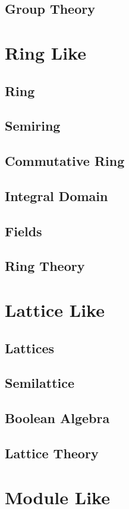 \documentclass[a4paper, 12pt]{article}
\numberwithin{equation}{section}
\begin{document}
\subsection{Group Theory}

\newpage
\section{Ring Like}
\subsection{Ring}
\subsection{Semiring}
\subsection{Commutative Ring}
\subsection{Integral Domain}
\subsection{Fields}
\subsection{Ring Theory}

\newpage
\section{Lattice Like}
\subsection{Lattices}
\subsection{Semilattice}
\subsection{Boolean Algebra}
\subsection{Lattice Theory}

\newpage
\section{Module Like}
\end{document}
